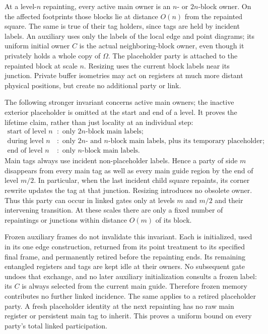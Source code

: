 At a level-$n$ repainting, every active main owner is an $n$- or
$2n$-block owner.  On the affected footprints those blocks lie at
distance $O(n)$ from the repainted square.  The same is true of
their tag holders, since tags are held by incident labels.  An
auxiliary uses only the labels of the local edge and point diagrams;
its uniform initial owner $C$ is the actual neighboring-block owner,
even though it privately holds a whole copy of $\Omega$.  The
placeholder party is attached to the repainted block at scale $n$.
Resizing uses the current block labels near its junction.  Private
buffer isometries may act on registers at much more distant physical
positions, but create no additional party or link.

The following stronger invariant concerns active main owners; the
inactive exterior placeholder is omitted at the start and end of a
level. It proves the lifetime claim, rather than just locality at an
individual step:
\begin{equation}
 \begin{aligned}
  \text{start of level }n &: \text{ only }2n\text{-block main labels};\\
  \text{during level }n &: \text{ only }2n\text{- and }n\text{-block main labels,
       plus its temporary placeholder};\\
  \text{end of level }n &: \text{ only }n\text{-block main labels}.
 \end{aligned}
 \label{eq:geometry-active-labels}
\end{equation}
Main tags always use incident non-placeholder labels.  Hence a party
of side $m$ disappears from every main tag as well as every main
guide region by the end of level $m/2$.  In particular, when the last
incident child square repaints, its corner rewrite updates the tag
at that junction.  Resizing introduces no obsolete owner.  Thus
this party can occur in linked gates only at levels $m$ and $m/2$
and their intervening transition.  At these scales there are only
a fixed number of repaintings or junctions within distance $O(m)$
of its block.

Frozen auxiliary frames do not invalidate this invariant.  Each is
initialized, used in its one edge construction, returned from its
point treatment to its specified final frame, and permanently
retired before the repainting ends.  Its remaining entangled
registers and tags are kept idle at their owners.  No subsequent
gate undoes that exchange, and no later auxiliary initialization
consults a frozen label: its $C$ is always selected from the current
main guide.  Therefore frozen memory contributes no further linked
incidence.  The same applies to a retired placeholder party.  A
fresh placeholder identity at the next repainting has no raw main
register or persistent main tag to inherit.  This proves a uniform
bound on every party's total linked participation.

